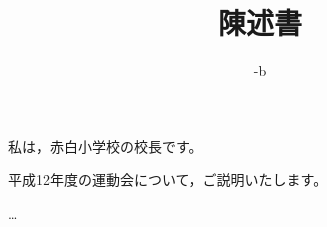\documentclass[a4paper,papersize,12pt]{jsarticle}
\begin{document}
\title{陳述書}

\date{-b}


\maketitle

\sectionZ{}

私は，赤白小学校の校長です。

平成12年度の運動会について，ご説明いたします。

…
\end{document}
